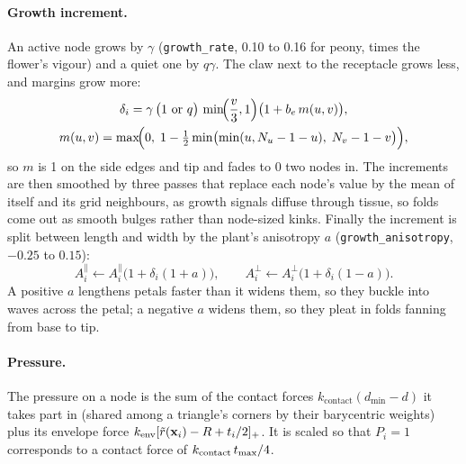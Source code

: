 \paragraph{Growth increment.} An active node grows by $\gamma$
(\texttt{growth\_rate}, 0.10 to 0.16 for peony, times the flower's vigour) and a
quiet one by $q\gamma$. The claw next to the receptacle grows less, and margins grow
more:
\[
\begin{gathered}
  \delta_i = \gamma\,\bigl(1 \text{ or } q\bigr)\,\min\!\Bigl(\frac{v}{3}, 1\Bigr)\bigl(1 + b_e\,m(u,v)\bigr),
  \\
  m(u,v) = \max\!\Bigl(0,\; 1 - \tfrac12\min\bigl(\min(u, N_u-1-u),\; N_v-1-v\bigr)\Bigr),
\end{gathered}
\]
so $m$ is 1 on the side edges and tip and fades to 0 two nodes in. The
increments are then smoothed by three passes that replace each node's value by
the mean of itself and its grid neighbours, as growth signals diffuse through
tissue, so folds come out as smooth bulges rather than node-sized kinks.
Finally the increment is split between length and width by the plant's
anisotropy $a$ (\texttt{growth\_anisotropy}, $-0.25$ to $0.15$):
\[
  A^\parallel_i \leftarrow A^\parallel_i\bigl(1 + \delta_i(1+a)\bigr),
  \qquad
  A^\perp_i \leftarrow A^\perp_i\bigl(1 + \delta_i(1-a)\bigr).
\]
A positive $a$ lengthens petals faster than it widens them, so they buckle
into waves across the petal; a negative $a$ widens them, so they pleat in folds
fanning from base to tip.

\paragraph{Pressure.} The pressure on a node is the sum of the contact forces
$k_{\mathrm{contact}}(d_{\min}-d)$ it takes part in (shared among a triangle's
corners by their barycentric weights) plus its envelope force
$k_{\mathrm{env}}[\tilde r(\mathbf{x}_i) - R + t_i/2]_+$. It is scaled so that $P_i = 1$
corresponds to a contact force of $k_{\mathrm{contact}}\,t_{\max}/4$.

